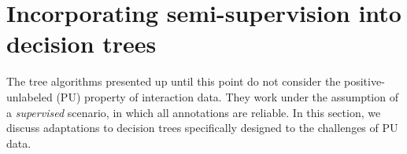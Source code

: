 


\section{Incorporating semi-supervision into decision trees}
\label{sec:ss trees}


The tree algorithms presented up until this point do not consider the positive-unlabeled (PU) property of interaction data. They work under the assumption of a \emph{supervised} scenario, in which all annotations are reliable. In this section, we discuss adaptations to decision trees specifically designed to the challenges of PU data.
%

